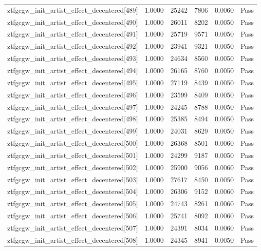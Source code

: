 \begin{table}[htbp]
\begin{tabular}{llrrll}
ztfgcgw\_init\_artist\_effect\_decentered[489] & 1.0000 & 25242 & 7806 & 0.0060 & Pass \\
ztfgcgw\_init\_artist\_effect\_decentered[490] & 1.0000 & 26011 & 8202 & 0.0050 & Pass \\
ztfgcgw\_init\_artist\_effect\_decentered[491] & 1.0000 & 25719 & 9571 & 0.0050 & Pass \\
ztfgcgw\_init\_artist\_effect\_decentered[492] & 1.0000 & 23941 & 9321 & 0.0050 & Pass \\
ztfgcgw\_init\_artist\_effect\_decentered[493] & 1.0000 & 24634 & 8560 & 0.0050 & Pass \\
ztfgcgw\_init\_artist\_effect\_decentered[494] & 1.0000 & 26165 & 8760 & 0.0050 & Pass \\
ztfgcgw\_init\_artist\_effect\_decentered[495] & 1.0000 & 27119 & 8439 & 0.0050 & Pass \\
ztfgcgw\_init\_artist\_effect\_decentered[496] & 1.0000 & 23599 & 8409 & 0.0050 & Pass \\
ztfgcgw\_init\_artist\_effect\_decentered[497] & 1.0000 & 24245 & 8788 & 0.0050 & Pass \\
ztfgcgw\_init\_artist\_effect\_decentered[498] & 1.0000 & 25385 & 8494 & 0.0050 & Pass \\
ztfgcgw\_init\_artist\_effect\_decentered[499] & 1.0000 & 24031 & 8629 & 0.0050 & Pass \\
ztfgcgw\_init\_artist\_effect\_decentered[500] & 1.0000 & 26368 & 8501 & 0.0060 & Pass \\
ztfgcgw\_init\_artist\_effect\_decentered[501] & 1.0000 & 24299 & 9187 & 0.0050 & Pass \\
ztfgcgw\_init\_artist\_effect\_decentered[502] & 1.0000 & 25900 & 9056 & 0.0060 & Pass \\
ztfgcgw\_init\_artist\_effect\_decentered[503] & 1.0000 & 27617 & 8450 & 0.0050 & Pass \\
ztfgcgw\_init\_artist\_effect\_decentered[504] & 1.0000 & 26306 & 9152 & 0.0060 & Pass \\
ztfgcgw\_init\_artist\_effect\_decentered[505] & 1.0000 & 24743 & 8261 & 0.0060 & Pass \\
ztfgcgw\_init\_artist\_effect\_decentered[506] & 1.0000 & 25741 & 8092 & 0.0060 & Pass \\
ztfgcgw\_init\_artist\_effect\_decentered[507] & 1.0000 & 24391 & 8034 & 0.0060 & Pass \\
ztfgcgw\_init\_artist\_effect\_decentered[508] & 1.0000 & 24345 & 8941 & 0.0050 & Pass \\

\end{tabular}
\end{table}
